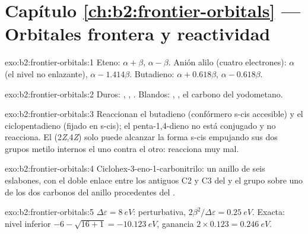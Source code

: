 \section*{Capítulo \ref{ch:b2:frontier-orbitals} --- Orbitales frontera y reactividad}

\begin{solution}{exo:b2:frontier-orbitals:1}
Eteno:  $\alpha + \beta$,  $\alpha - \beta$. Anión alilo (cuatro electrones):  $\alpha$ (el
nivel no enlazante),  $\alpha - 1.414\beta$. Butadieno:  $\alpha + 0.618\beta$,  $\alpha -
0.618\beta$.
\end{solution}

\begin{solution}{exo:b2:frontier-orbitals:2}
Duros: , , . Blandos: , , el carbono del yodometano.
\end{solution}

\begin{solution}{exo:b2:frontier-orbitals:3}
Reaccionan el butadieno (confórmero s-cis accesible) y el ciclopentadieno (fijado en s-cis);
el penta-1,4-dieno no está conjugado y no reacciona. El  (2\textit{Z},4\textit{Z}) solo puede
alcanzar la forma s-cis empujando sus dos grupos metilo internos el uno contra el otro:
reacciona muy mal.
\end{solution}

\begin{solution}{exo:b2:frontier-orbitals:4}
Ciclohex-3-eno-1-carbonitrilo: un anillo de seis eslabones, con el doble enlace entre los antiguos C2
y C3 del  y el grupo  sobre uno de los dos carbonos del anillo procedentes del
.
\end{solution}

\begin{solution}{exo:b2:frontier-orbitals:5}
$\Delta\varepsilon = \qty{8}{eV}$: perturbativa, $2\beta^2/\Delta\varepsilon = \qty{0.25}{eV}$. Exacta: nivel inferior
$-6 - \sqrt{16 + 1} = \qty{-10.123}{eV}$, ganancia $2 \times 0.123 = \qty{0.246}{eV}$.
\end{solution}

